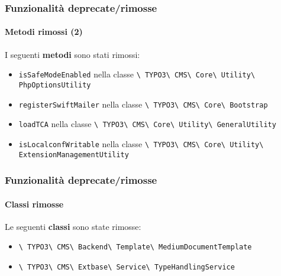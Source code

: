 \begin{frame}[fragile]
	\frametitle{Funzionalità deprecate/rimosse}
	\framesubtitle{Metodi rimossi (2)}

	I seguenti \textbf{metodi} sono stati rimossi:

	\begin{itemize}

		\item
			\small
				\texttt{isSafeModeEnabled}\newline
				nella classe
				\texttt{\textbackslash
					TYPO3\textbackslash
					CMS\textbackslash
					Core\textbackslash
					Utility\textbackslash
					PhpOptionsUtility}
			\normalsize
		\item
			\small
				\texttt{registerSwiftMailer}\newline
				nella classe
				\texttt{\textbackslash
					TYPO3\textbackslash
					CMS\textbackslash
					Core\textbackslash
					Bootstrap}
			\normalsize
		\item
			\small
				\texttt{loadTCA}\newline
				nella classe
				\texttt{\textbackslash
					TYPO3\textbackslash
					CMS\textbackslash
					Core\textbackslash
					Utility\textbackslash
					GeneralUtility}
			\normalsize
		\item
			\small
				\texttt{isLocalconfWritable}\newline
				nella classe
				\texttt{\textbackslash
					TYPO3\textbackslash
					CMS\textbackslash
					Core\textbackslash
					Utility\textbackslash
					ExtensionManagementUtility}
			\normalsize

	\end{itemize}

\end{frame}


\begin{frame}[fragile]
	\frametitle{Funzionalità deprecate/rimosse}
	\framesubtitle{Classi rimosse}

	Le seguenti \textbf{classi} sono state rimosse:

	\begin{itemize}

		\item
			\smaller
				\texttt{\textbackslash
					TYPO3\textbackslash
					CMS\textbackslash
					Backend\textbackslash
					Template\textbackslash
					MediumDocumentTemplate}
			\normalsize
		\item
			\smaller
				\texttt{\textbackslash
					TYPO3\textbackslash
					CMS\textbackslash
					Extbase\textbackslash
					Service\textbackslash
					TypeHandlingService}
			\normalsize

	\end{itemize}

\end{frame}

